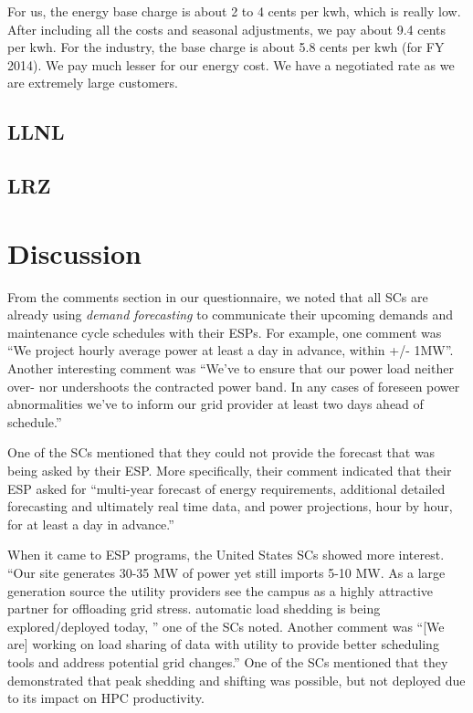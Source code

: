 For us, the energy base charge is about 2 to 4 cents per kwh, which is really low. After including all the costs and seasonal adjustments, we pay about 9.4 cents per kwh.  For the industry, the base charge is about 5.8 cents per kwh (for FY 2014). We pay much lesser for our energy cost. We have a negotiated rate as we are extremely large customers.

\subsection{LLNL}
\subsection{LRZ}


\section{Discussion}
\label{comm}
From the comments section in our questionnaire, we noted that all SCs are already using \emph{demand forecasting} to communicate their upcoming demands and maintenance cycle schedules with their ESPs. For example, one comment was ``We project hourly average power at least a day in advance, within +/- 1MW''. Another interesting comment was ``We've to ensure that our power load neither over- nor undershoots the contracted power band. In any cases of foreseen power abnormalities we've to inform our grid provider at least two days ahead of schedule.''

One of the SCs mentioned that they could not provide the forecast that was being asked by their ESP. More specifically, their comment indicated that their ESP asked for ``multi-year forecast of energy requirements, additional detailed forecasting and ultimately real time data, and power projections, hour by hour, for at least a day in advance.''

When it came to ESP programs, the United States SCs showed more interest. ``Our site generates 30-35 MW of power yet still imports 5-10 MW. As a large generation source the utility providers see the campus as a highly attractive partner for offloading grid stress. automatic load shedding is being explored/deployed today, '' one of the SCs noted. Another comment was ``[We are] working on load sharing of data with utility to provide better scheduling tools and address potential grid changes.'' One of the SCs mentioned that they demonstrated that peak shedding and shifting was possible, but not deployed due to its impact on HPC productivity. 

